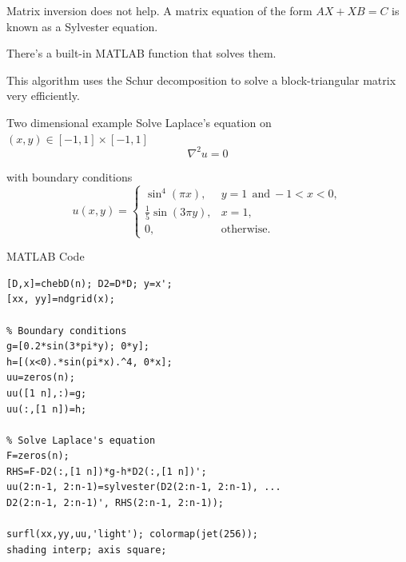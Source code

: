 \documentclass[xcolor={dvipsnames}]{beamer}
\begin{document}
\begin{frame}{Matrix inversion does not help.}{}
A matrix equation of the form $AX+XB=C$ is known as a Sylvester equation.

\bigskip
There's a built-in MATLAB function that solves them.

\bigskip
{}

\bigskip
This algorithm uses the Schur decomposition to solve a block-triangular matrix very efficiently. 
\end{frame}

\begin{frame}{Two dimensional example}{}
Solve Laplace's equation on $(x,y)\in[-1,1]\times[-1,1]$
\begin{equation*}
\nabla^2 u=0
\end{equation*}

with boundary conditions 
\begin{equation*}
u(x,y)=\begin{cases}
\sin^4(\pi x), & y=1 ~~\text{and}~ -1<x<0,\\
\frac{1}{5}\sin(3\pi y), & x=1,\\
0, & \text{otherwise}.
\end{cases}
\end{equation*}
\end{frame}

\begin{frame}[fragile]{MATLAB Code}{}
\begin{lstlisting}
[D,x]=chebD(n); D2=D*D; y=x';
[xx, yy]=ndgrid(x);

% Boundary conditions
g=[0.2*sin(3*pi*y); 0*y];
h=[(x<0).*sin(pi*x).^4, 0*x];
uu=zeros(n);
uu([1 n],:)=g;
uu(:,[1 n])=h;

% Solve Laplace's equation
F=zeros(n);
RHS=F-D2(:,[1 n])*g-h*D2(:,[1 n])';
uu(2:n-1, 2:n-1)=sylvester(D2(2:n-1, 2:n-1), ...
D2(2:n-1, 2:n-1)', RHS(2:n-1, 2:n-1));

surfl(xx,yy,uu,'light'); colormap(jet(256));
shading interp; axis square;
\end{lstlisting}
\end{frame}
\end{document}
